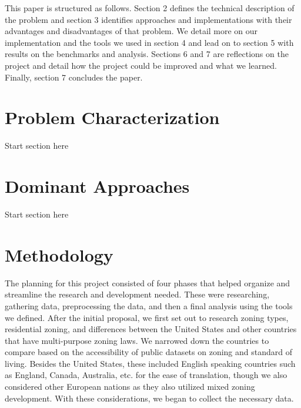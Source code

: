 \documentclass[titlepage]{article}
\begin{document}
This paper is structured  as follows. Section 2 defines the technical description of the problem and section 3 identifies approaches and implementations with their advantages and disadvantages of that problem. We detail more on our implementation and the tools we used in section 4 and lead on to section 5 with results on the benchmarks and analysis. Sections 6 and 7 are reflections on the project and detail how the project could be improved and what we learned. Finally, section 7 concludes the paper.


\section{Problem Characterization}
Start section here

\section{Dominant Approaches}
Start section here

\section{Methodology}
The planning for this project consisted of four phases that helped organize and streamline the research and development needed. These were researching, gathering data, preprocessing the data, and then a final analysis using the tools we defined. After the initial proposal, we first set out to research zoning types, residential zoning, and differences between the United States and other countries that have multi-purpose zoning laws. We narrowed down the countries to compare based on the accessibility of public datasets on zoning and standard of living. Besides the United States, these included English speaking countries such as England, Canada, Australia, etc. for the ease of translation, though we also considered other European nations as they also utilized mixed zoning development. With these considerations, we began to collect the necessary data.
\end{document}
